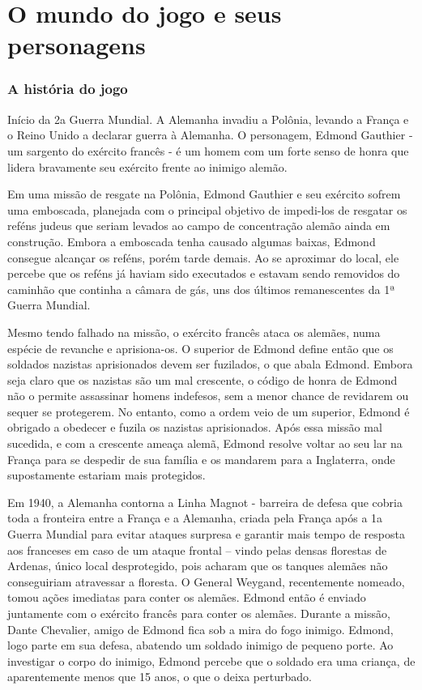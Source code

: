 \part*{O mundo do jogo e seus personagens}
\section{A história do jogo}

   Início da 2a Guerra Mundial. A Alemanha invadiu a Polônia, levando a França e o Reino Unido a declarar guerra à Alemanha. O personagem, Edmond Gauthier - um sargento do exército francês - é um homem com um forte senso de honra que lidera bravamente seu exército frente ao inimigo alemão.
   
Em uma missão de resgate na Polônia, Edmond Gauthier e seu exército sofrem uma emboscada, planejada com o principal objetivo de impedi-los de resgatar os reféns judeus que seriam levados ao campo de concentração alemão ainda em construção. Embora a emboscada tenha causado algumas baixas, Edmond consegue alcançar os reféns, porém tarde demais. Ao se aproximar do local, ele percebe que os reféns já haviam sido executados e estavam sendo removidos do caminhão que continha a câmara de gás, uns dos últimos remanescentes da 1ª Guerra Mundial.
   
    Mesmo tendo falhado na missão, o exército francês ataca os alemães, numa espécie de revanche e  aprisiona-os. O superior de Edmond define então que os soldados nazistas aprisionados devem ser fuzilados, o que abala Edmond. Embora seja claro que os nazistas são um mal crescente, o código de honra de Edmond não o permite assassinar homens indefesos, sem a menor chance de revidarem ou sequer se protegerem. No entanto, como a ordem veio de um superior, Edmond é obrigado a obedecer e fuzila os nazistas aprisionados. Após essa missão mal sucedida, e com a crescente ameaça alemã, Edmond resolve voltar ao seu lar na França para se despedir de sua família e os mandarem para a Inglaterra, onde supostamente estariam mais protegidos.
    
    Em 1940, a Alemanha contorna a Linha Magnot - barreira de defesa que cobria toda a fronteira entre a França e a Alemanha, criada pela França após a 1a Guerra Mundial para evitar ataques surpresa e garantir mais tempo de resposta aos franceses em caso de um ataque frontal – vindo pelas densas florestas de Ardenas, único local desprotegido, pois acharam que os tanques alemães não conseguiriam atravessar a floresta. O General Weygand, recentemente nomeado, tomou ações imediatas para conter os alemães. Edmond então é enviado juntamente com o exército francês para conter os alemães. Durante a missão, Dante Chevalier, amigo de Edmond fica sob a mira do fogo inimigo. Edmond, logo parte em sua defesa, abatendo um soldado inimigo de pequeno porte. Ao investigar o corpo do inimigo, Edmond percebe que o soldado era uma criança, de aparentemente menos que 15 anos, o que o deixa perturbado. 
    
